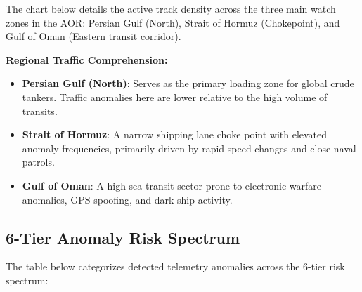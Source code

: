 \documentclass[11pt,a4paper]{article}
\begin{document}
\noindent The chart below details the active track density across the three main watch zones in the AOR: Persian Gulf (North), Strait of Hormuz (Chokepoint), and Gulf of Oman (Eastern transit corridor).

\vspace{0.4cm}
\begin{center}
\end{center}
\vspace{0.3cm}

\noindent \textbf{Regional Traffic Comprehension:}
\begin{itemize}
    \item \textbf{Persian Gulf (North)}: Serves as the primary loading zone for global crude tankers. Traffic anomalies here are lower relative to the high volume of transits.
    \item \textbf{Strait of Hormuz}: A narrow shipping lane choke point with elevated anomaly frequencies, primarily driven by rapid speed changes and close naval patrols.
    \item \textbf{Gulf of Oman}: A high-sea transit sector prone to electronic warfare anomalies, GPS spoofing, and dark ship activity.
\end{itemize}
\vspace{0.4cm}

\subsection{6-Tier Anomaly Risk Spectrum}
The table below categorizes detected telemetry anomalies across the 6-tier risk spectrum:
\end{document}
